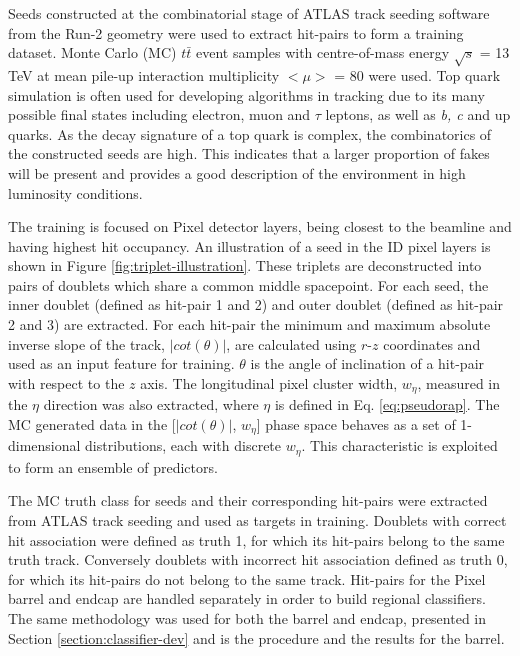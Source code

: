 Seeds constructed at the combinatorial stage of ATLAS track seeding software from the Run-2 geometry were used to extract hit-pairs to form a training dataset. Monte Carlo (MC) $t\bar{t}$ event samples with centre-of-mass energy $\sqrt{s}$ = 13 TeV at mean pile-up interaction multiplicity $< \mu >$ = 80 were used. Top quark simulation is often used for developing algorithms in tracking due to its many possible final states including electron, muon and $\tau$ leptons, as well as \textit{b, c} and up quarks. As the decay signature of a top quark is complex, the combinatorics of the constructed seeds are high. This indicates that a larger proportion of fakes will be present and provides a good description of the environment in high luminosity conditions.

The training is focused on Pixel detector layers, being closest to the beamline and having highest hit occupancy. An illustration of a seed in the ID pixel layers is shown in Figure \ref{fig:triplet-illustration}. These triplets are deconstructed into pairs of doublets which share a common middle spacepoint. For each seed, the inner doublet (defined as hit-pair 1 and 2) and outer doublet (defined as hit-pair 2 and 3) are extracted. For each hit-pair the minimum and maximum absolute inverse slope of the track, $|cot(\theta)|$, are calculated using $r$-$z$ coordinates and used as an input feature for training. $\theta$ is the angle of inclination of a hit-pair with respect to the $z$ axis. The longitudinal pixel cluster width, $w_{\eta}$, measured in the $\eta$ direction was also extracted, where $\eta$ is defined in Eq. \ref{eq:pseudorap}. The MC generated data in the [$|cot(\theta)|$, $w_{\eta}$] phase space behaves as a set of 1-dimensional distributions, each with discrete $w_{\eta}$. This characteristic is exploited to form an ensemble of predictors. 

The MC truth class for seeds and their corresponding hit-pairs were extracted from ATLAS track seeding and used as targets in training. Doublets with correct hit association were defined as truth 1, for which its hit-pairs belong to the same truth track. Conversely doublets with incorrect hit association defined as truth 0, for which its hit-pairs do not belong to the same track. Hit-pairs for the Pixel barrel and endcap are handled separately in order to build regional classifiers. The same methodology was used for both the barrel and endcap, presented in Section \ref{section:classifier-dev} and \label{application-of-hit-pair-predictor} is the procedure and the results for the barrel.



